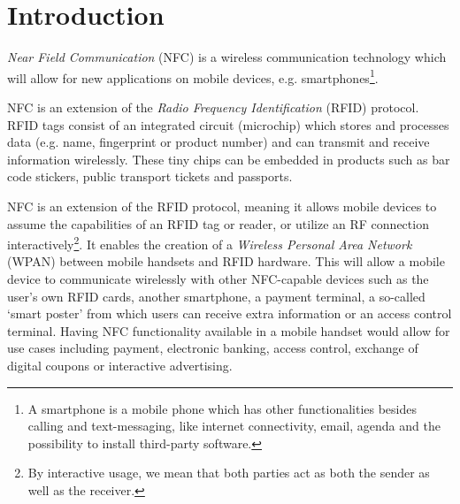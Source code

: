 \section{Introduction}


\textit{Near Field Communication} (NFC) is a wireless communication technology which will allow for new applications on mobile devices, e.g. smartphones\footnote{A smartphone is a mobile phone which has other functionalities besides calling and text-messaging, like internet connectivity, email, agenda and the possibility to install third-party software.}.

NFC is an extension of the \textit{Radio Frequency Identification} (RFID) protocol.
RFID tags consist of an integrated circuit (microchip) which stores and processes data (e.g. name, fingerprint or product number) and can transmit and receive information wirelessly. %
These tiny chips can be embedded in products such as bar code stickers, public transport tickets and passports.

 
NFC is an extension of the RFID protocol, meaning it allows mobile devices to assume the capabilities of an RFID tag or reader, or utilize an RF connection interactively\footnote{By interactive usage, we mean that both parties act as both the sender as well as the receiver.}.
It enables the creation of a \textit{Wireless Personal Area Network} (WPAN) between mobile handsets and RFID hardware.
This will allow a mobile device to communicate wirelessly with other NFC-capable devices such as the user's own RFID cards, another smartphone, a payment terminal, a so-called `smart poster' from which users can receive extra information or an access control terminal.
Having NFC functionality available in a mobile handset would allow for use cases including payment, electronic banking, access control, exchange of digital coupons or interactive advertising.

